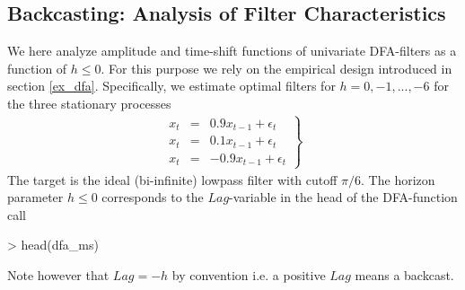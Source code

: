 \documentclass[a4paper]{book}
\begin{document}
\subsection{Backcasting: Analysis of Filter Characteristics}\label{back_fil}

We here analyze amplitude and time-shift functions of univariate DFA-filters as a function of $h\leq 0$. For this purpose we rely on the empirical design introduced in section \ref{ex_dfa}. Specifically, we estimate optimal filters for $h=0,-1,...,-6$ for the three stationary processes
\begin{eqnarray}
\left.\begin{array}{ccc}x_t&=&0.9x_{t-1}+\epsilon_t\\
x_t&=&0.1x_{t-1}+\epsilon_t\\
x_t&=&-0.9x_{t-1}+\epsilon_t
\end{array}\right\}\label{ar1_processes}
\end{eqnarray}
The target is the ideal (bi-infinite) lowpass filter with cutoff $\pi/6$. The horizon parameter $h\leq 0$ corresponds to the $Lag$-variable in the head of the DFA-function call
\begin{Schunk}
\begin{Sinput}
> head(dfa_ms)
\end{Sinput}
\begin{Soutput}
1 function (L, periodogram, Lag, Gamma)                            
2 {                                                                
3     periodogram[1] <- periodogram[1]/2                           
4     K <- length(periodogram) - 1                                 
5     X <- exp(-(0+1i) * Lag * pi * (0:(K))/(K)) * rep(1, K + 1) * 
6         sqrt(periodogram)                                        
\end{Soutput}
\end{Schunk}
Note however that $Lag=-h$ by convention i.e. a positive $Lag$ means a backcast. 
\end{document}
